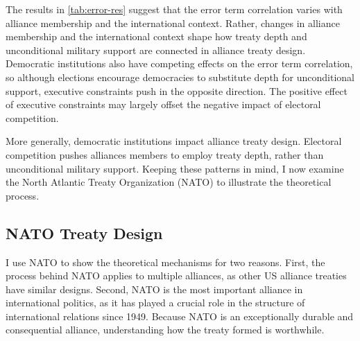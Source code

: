 \documentclass[12pt]{article}
\begin{document}
The results in \autoref{tab:error-res} suggest that the error term correlation varies with alliance membership and the international context. 
Rather, changes in alliance membership and the international context shape how treaty depth and unconditional military support are connected in alliance treaty design. 
Democratic institutions also have competing effects on the error term correlation, so although elections encourage democracies to substitute depth for unconditional support, executive constraints push in the opposite direction. 
The positive effect of executive constraints may largely offset the negative impact of electoral competition. 


More generally, democratic institutions impact alliance treaty design. 
Electoral competition pushes alliances members to employ treaty depth, rather than unconditional military support.  
Keeping these patterns in mind, I now examine the North Atlantic Treaty Organization (NATO) to illustrate the theoretical process. 


\subsection{NATO Treaty Design}


I use NATO to show the theoretical mechanisms for two reasons. 
First, the process behind NATO applies to multiple alliances, as other US alliance treaties have similar designs. 
Second, NATO is the most important alliance in international politics, as it has played a crucial role in the structure of international relations since 1949. 
Because NATO is an exceptionally durable and consequential alliance, understanding how the treaty formed is worthwhile. 
\end{document}
